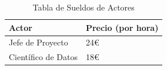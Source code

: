 \begin{table}[htp]
	\centering
		\begin{tabular}{ | l | l | }
			\hline
			\rowcolor[HTML]{90D5FF} 
			\textbf{Actor} & \textbf{Precio (por hora)}\\
			\hline
			
			Jefe de Proyecto & 24€ \\
			\hline
			Científico de Datos & 18€ \\
			\hline
			
		\end{tabular} 
		
		\caption{Tabla de Sueldos de Actores}
	\end{table}